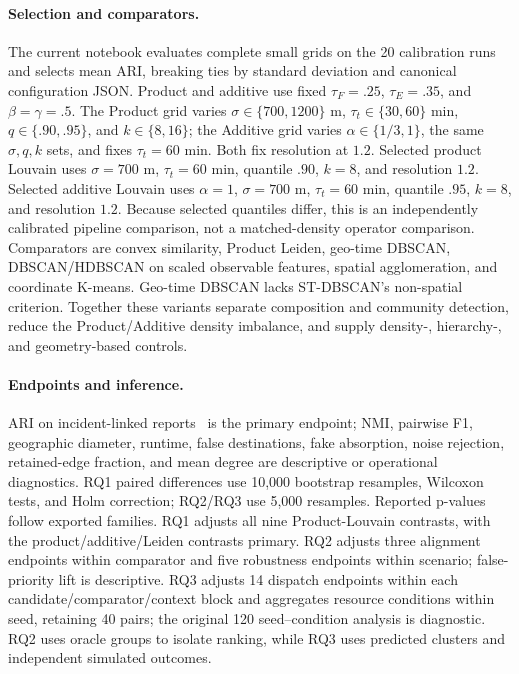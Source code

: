 \documentclass[runningheads]{llncs}
\begin{document}
\paragraph{Selection and comparators.}
The current notebook evaluates complete small grids on the 20 calibration
runs and selects mean ARI, breaking ties by standard deviation and canonical
configuration JSON. Product and additive use fixed $\tau_F=.25$,
$\tau_E=.35$, and $\beta=\gamma=.5$. The Product grid varies
$\sigma\in\{700,1200\}$ m, $\tau_t\in\{30,60\}$ min,
$q\in\{.90,.95\}$, and $k\in\{8,16\}$; the Additive grid varies
$\alpha\in\{1/3,1\}$, the same $\sigma,q,k$ sets, and fixes
$\tau_t=60$ min. Both fix resolution at $1.2$. Selected product Louvain uses
$\sigma=700$ m, $\tau_t=60$ min, quantile $.90$, $k=8$, and resolution $1.2$.
Selected additive Louvain uses $\alpha=1$, $\sigma=700$ m, $\tau_t=60$ min,
quantile $.95$, $k=8$, and resolution $1.2$. Because selected quantiles
differ, this is an independently calibrated pipeline comparison, not a
matched-density operator comparison. Comparators are convex similarity,
Product Leiden, geo-time DBSCAN, DBSCAN/HDBSCAN on scaled observable features,
spatial agglomeration, and coordinate K-means. Geo-time DBSCAN lacks
ST-DBSCAN's non-spatial criterion. Together these variants separate
composition and community detection, reduce the Product/Additive density
imbalance, and supply density-, hierarchy-, and geometry-based controls.

\paragraph{Endpoints and inference.}
ARI on incident-linked reports~\cite{hubert1985comparing} is the primary
endpoint; NMI, pairwise F1, geographic diameter, runtime, false destinations,
fake absorption, noise rejection, retained-edge fraction, and mean degree are
descriptive or operational diagnostics. RQ1 paired differences use 10,000
bootstrap resamples, Wilcoxon tests, and Holm correction; RQ2/RQ3 use 5,000
resamples. Reported p-values follow exported families. RQ1 adjusts all nine
Product-Louvain contrasts, with the product/additive/Leiden contrasts primary.
RQ2 adjusts three alignment endpoints within comparator and five robustness
endpoints within scenario; false-priority lift is descriptive. RQ3 adjusts 14
dispatch endpoints within each candidate/comparator/context block and
aggregates resource conditions within seed, retaining 40 pairs; the original
120 seed--condition analysis is diagnostic. RQ2 uses oracle groups to isolate
ranking, while RQ3 uses predicted clusters and independent simulated outcomes.
\end{document}
